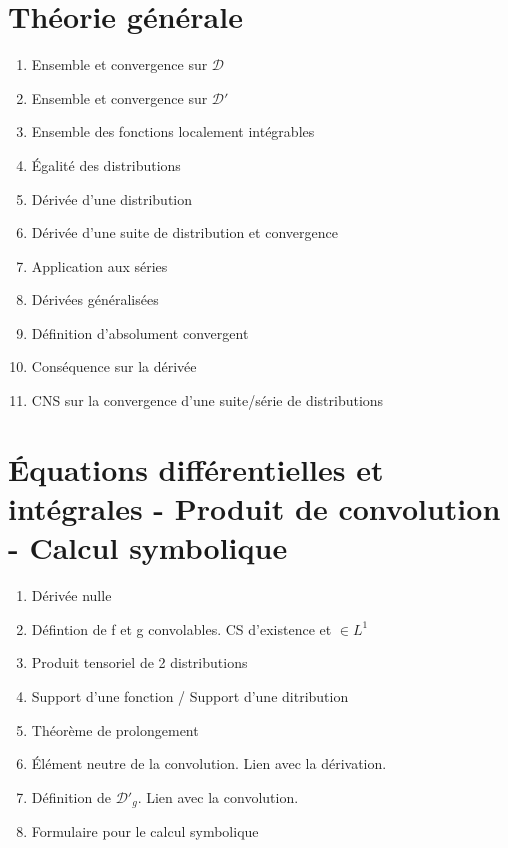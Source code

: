 \documentclass{article}
\begin{document}
\section{Théorie générale}
\begin{enumerate}
\item Ensemble et convergence sur $\mathcal{D}$
\item Ensemble et convergence sur $\mathcal{D}'$
\item Ensemble des fonctions localement intégrables
\item Égalité des distributions
\item Dérivée d'une distribution
\item Dérivée d'une suite de distribution et convergence
\item Application aux séries
\item Dérivées généralisées
\item Définition d'absolument convergent
\item Conséquence sur la dérivée
\item CNS sur la convergence d'une suite/série de distributions
\end{enumerate}

\section{Équations différentielles et intégrales - Produit de convolution - Calcul symbolique}
\begin{enumerate}
\item Dérivée nulle
\item Défintion de f et g convolables. CS d'existence et $\in L^1$
\item Produit tensoriel de 2 distributions
\item Support d'une fonction / Support d'une ditribution
\item Théorème de prolongement
\item Élément neutre de la convolution. Lien avec la dérivation.
\item Définition de $\mathcal{D}'_g$. Lien avec la convolution.
\item Formulaire pour le calcul symbolique
\end{enumerate}
\end{document}

